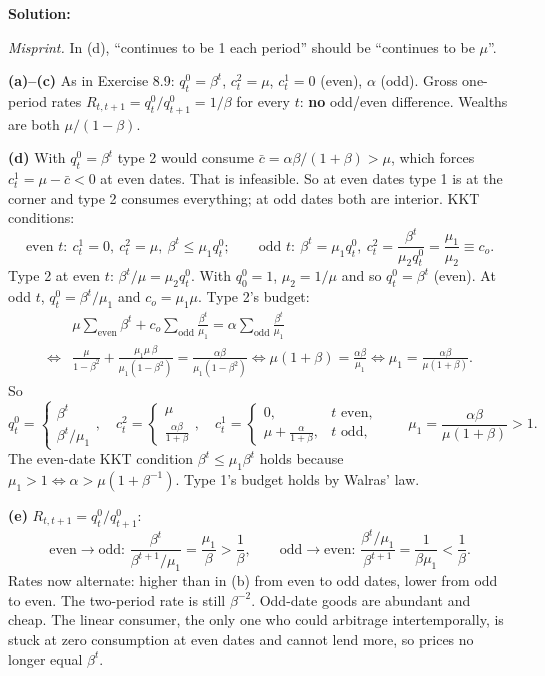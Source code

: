 \documentclass[12pt, letterpaper]{article}
\begin{document}
\begin{tcolorbox}[evenbox,title={Exercise 8.10 \quad Corners}]
\textbf{Solution:}

\emph{Misprint.} In (d), ``continues to be 1 each period'' should be ``continues to be $\mu$''.

\textbf{(a)--(c)} As in Exercise 8.9: $q^0_t=\beta^t$, $c^2_t=\mu$, $c^1_t=0$ (even), $\alpha$ (odd). Gross one-period
rates $R_{t,t+1}=q^0_t/q^0_{t+1}=1/\beta$ for every $t$: \textbf{no} odd/even difference. Wealths are both
$\mu/(1-\beta)$.

\textbf{(d)} With $q^0_t=\beta^t$ type 2 would consume $\bar c=\alpha\beta/(1+\beta)>\mu$, which forces $c^1_t=\mu-\bar c<0$ at
even dates. That is infeasible. So at even dates type 1 is at the corner and type 2 consumes everything; at odd
dates both are interior. KKT conditions:
\[
\text{even }t:\ c^1_t=0,\ c^2_t=\mu,\ \beta^t\le\mu_1q^0_t;\qquad
\text{odd }t:\ \beta^t=\mu_1q^0_t,\ c^2_t=\frac{\beta^t}{\mu_2q^0_t}=\frac{\mu_1}{\mu_2}\equiv c_o .
\]
Type 2 at even $t$: $\beta^t/\mu=\mu_2q^0_t$. With $q^0_0=1$, $\mu_2=1/\mu$ and so $q^0_t=\beta^t$ (even). At odd $t$,
$q^0_t=\beta^t/\mu_1$ and $c_o=\mu_1\mu$. Type 2's budget:
\begin{align*}
&\mu\sum_{\text{even}}\beta^t+c_o\sum_{\text{odd}}\frac{\beta^t}{\mu_1}=\alpha\sum_{\text{odd}}\frac{\beta^t}{\mu_1}\\
\iff&\frac{\mu}{1-\beta^2}+\frac{\mu_1\mu\,\beta}{\mu_1(1-\beta^2)}=\frac{\alpha\beta}{\mu_1(1-\beta^2)}
\iff\mu(1+\beta)=\frac{\alpha\beta}{\mu_1}\iff\mu_1=\frac{\alpha\beta}{\mu(1+\beta)} .
\end{align*}
So
\[
\boxed{q^0_t=\begin{cases}\beta^t\\\beta^t/\mu_1\end{cases}\!,\quad
c^2_t=\begin{cases}\mu\\\frac{\alpha\beta}{1+\beta}\end{cases}\!,\quad
c^1_t=\begin{cases}0,&t\text{ even},\\\mu+\frac{\alpha}{1+\beta},&t\text{ odd},\end{cases}}\qquad\mu_1=\frac{\alpha\beta}{\mu(1+\beta)}>1 .
\]
The even-date KKT condition $\beta^t\le\mu_1\beta^t$ holds because $\mu_1>1\iff\alpha>\mu(1+\beta^{-1})$. \checkmark{} Type 1's
budget holds by Walras' law.

\textbf{(e)} $R_{t,t+1}=q^0_t/q^0_{t+1}$:
\[
\text{even}\to\text{odd: }\frac{\beta^t}{\beta^{t+1}/\mu_1}=\frac{\mu_1}{\beta}>\frac1\beta,\qquad
\text{odd}\to\text{even: }\frac{\beta^t/\mu_1}{\beta^{t+1}}=\frac{1}{\beta\mu_1}<\frac1\beta .
\]
Rates now alternate: higher than in (b) from even to odd dates, lower from odd to even. The two-period rate is
still $\beta^{-2}$. Odd-date goods are abundant and cheap. The linear consumer, the only one who could arbitrage
intertemporally, is stuck at zero consumption at even dates and cannot lend more, so prices no longer equal
$\beta^t$.


\end{tcolorbox}
\end{document}
